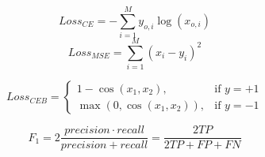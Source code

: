 \begin{equation}\label{eq:ce}
   Loss_{CE} = -\sum_{i=1}^My_{o,i}\log(x_{o,i})
\end{equation}
\begin{equation}\label{eq:mse}
   Loss_{MSE} = \sum_{i=1}^{M}(x_i-y_i)^2
\end{equation}

\begin{equation}\label{eq:ceb}
    Loss_{CEB} = \begin{cases}
        1 - \cos(x_1, x_2),      &\text{if $y = +1$}\\
        \max(0, \cos(x_1, x_2)), &\text{if $y = -1$}
    \end{cases}
\end{equation}

\begin{equation}\label{eq:f}
    F_1 = 2 \frac{precision \cdot recall}{precision + recall} = \frac{2 TP}{2TP + FP + FN}
 \end{equation}


